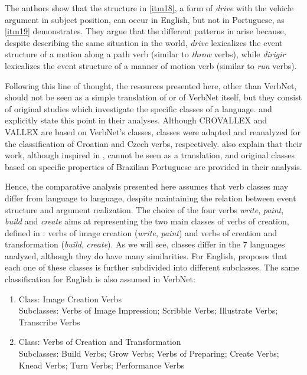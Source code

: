 \documentclass[english]{textolivre}
\begin{document}
The authors show that the structure in \ref{itm18}, a form of \textit{drive} with the vehicle argument in subject position, can occur in English, but not in Portuguese, as \ref{itm19} demonstrates. They argue that the different patterns in  arise because, despite describing the same situation in the world, \textit{drive} lexicalizes the event structure of a motion along a path verb (similar to \textit{throw} verbs), while \textit{dirigir} lexicalizes the event structure of a manner of motion verb (similar to \textit{run} verbs).

Following this line of thought, the resources presented here, other than VerbNet, should not be seen as a simple translation of \textcite{levin_english_1993} or of VerbNet itself, but they consist of original studies which investigate the specific classes of a language. \textcite{preradovic_crovallex:_2009} and \textcite{kettnerova_syntax-semantics_2012} explicitly state this point in their analyses. Although CROVALLEX and VALLEX are based on VerbNet’s classes, classes were adapted and reanalyzed for the classification of Croatian and Czech verbs, respectively. \textcite{cancado_catalogo_2013} also explain that their work, although inspired in \textcite{levin_english_1993}, cannot be seen as a translation, and original classes based on specific properties of Brazilian Portuguese are provided in their analysis.

Hence, the comparative analysis presented here assumes that verb classes may differ from language to language, despite maintaining the relation between event structure and argument realization. The choice of the four verbs \textit{write}, \textit{paint}, \textit{build} and \textit{create} aims at representing the two main classes of verbs of creation, defined in \textcite{levin_english_1993}: verbs of image creation (\textit{write}, \textit{paint}) and verbs of creation and transformation (\textit{build}, \textit{create}). As we will see, classes differ in the 7 languages analyzed, although they do have many similarities. For English, \textcite{levin_english_1993} proposes that each one of these classes is further subdivided into different subclasses. The same classification for English is also assumed in VerbNet:

\begin{enumerate}[label=(\arabic*),resume]
\item \label{itm20} Class: Image Creation Verbs\\
Subclasses: Verbs of Image Impression; Scribble Verbs; Illustrate Verbs; Transcribe Verbs
\item \label{itm21} Class: Verbs of Creation and Transformation \\
Subclasses: Build Verbs; Grow Verbs; Verbs of Preparing; Create Verbs; Knead Verbs; Turn Verbs; Performance Verbs
\end{enumerate}
\end{document}
